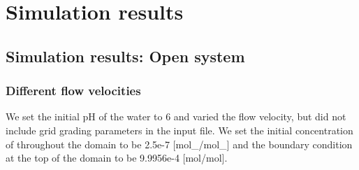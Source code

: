 \section{\DuMuX Simulation results}

\subsection{\DuMuX Simulation results: Open system}

\subsubsection*{Different flow velocities}\label{ssec:diffFlowVel}
We set the initial pH of the water to 6 and varied the flow velocity, but did not include grid grading parameters in the input file. We set the initial concentration of  throughout the domain to be 2.5e-7 [mol\_/mol\_] and the boundary condition at the top of the domain to be 9.9956e-4 [mol/mol].


